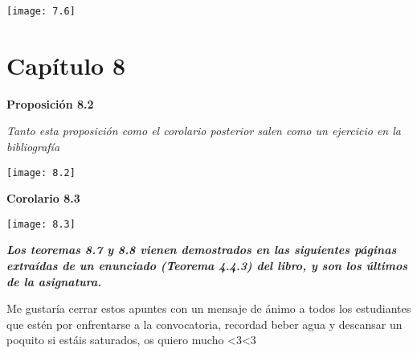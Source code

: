 \documentclass[openany]{book}
\begin{document}
\texttt{[image: 7.6]}


\chapter{Capítulo 8}

\begin{center}
\textbf{Proposición 8.2}
\end{center}

\textit{Tanto esta proposición como el corolario posterior salen como un ejercicio en la bibliografía}

\texttt{[image: 8.2]}


\begin{center}
\textbf{Corolario 8.3}
\end{center}


\texttt{[image: 8.3]}

\textbf{\textit{Los teoremas 8.7 y 8.8 vienen demostrados en las siguientes páginas extraídas de un enunciado (Teorema 4.4.3) del libro, y son los últimos de la asignatura.}}




Me gustaría cerrar estos apuntes con un mensaje de ánimo a todos los estudiantes que estén por enfrentarse a la convocatoria, recordad beber agua y descansar un poquito si estáis saturados, os quiero mucho <3<3
\end{document}
